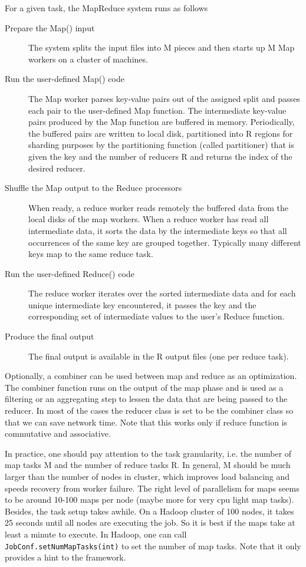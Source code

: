 \documentclass[12pt]{book}
\begin{document}
For a given task, the MapReduce system runs as follows
\begin{description}
\item[Prepare the Map() input]
The system splits the input files into M pieces and then starts up M Map workers on a cluster of machines.
\item[Run the user-defined Map() code]
The Map worker parses key-value pairs out of the assigned split and passes each pair to the user-defined Map function. The intermediate key-value pairs produced by the Map function are buffered in memory. Periodically, the buffered pairs are written to local disk, partitioned into R regions for sharding purposes by the partitioning function (called partitioner) that is given the key and the number of reducers R and returns the index of the desired reducer.
\item[Shuffle the Map output to the Reduce processors]
When ready, a reduce worker reads remotely the buffered data from the local disks of the map workers. When a reduce worker has read all intermediate data, it sorts the data by the intermediate keys so that all occurrences of the same key are grouped together. Typically many different keys map to the same reduce task.
\item[Run the user-defined Reduce() code]
The reduce worker iterates over the sorted intermediate data and for each unique intermediate key encountered, it passes the key and the corresponding set of intermediate values to the user's Reduce function.
\item[Produce the final output]
The final output is available in the R output files (one per reduce task).
\end{description}
Optionally, a combiner can be used between map and reduce as an optimization. The combiner function runs on the output of the map phase and is used as a filtering or an aggregating step to lessen the data that are being passed to the reducer. In most of the cases the reducer class is set to be the combiner class so that we can save network time. Note that this works only if reduce function is commutative and associative.

In practice, one should pay attention to the task granularity, i.e. the number of map tasks M and the number of reduce tasks R. In general, M should be much larger than the number of nodes in cluster, which improves load balancing and speeds recovery from worker failure. The right level of parallelism for maps seems to be around 10-100 maps per node (maybe more for very cpu light map tasks). Besides, the task setup takes awhile. On a Hadoop cluster of 100 nodes, it takes 25 seconds until all nodes are executing the job. So it is best if the maps take at least a minute to execute. In Hadoop, one can call \texttt{JobConf.setNumMapTasks(int)} to set the number of map tasks. Note that it only provides a hint to the framework.
\end{document}
